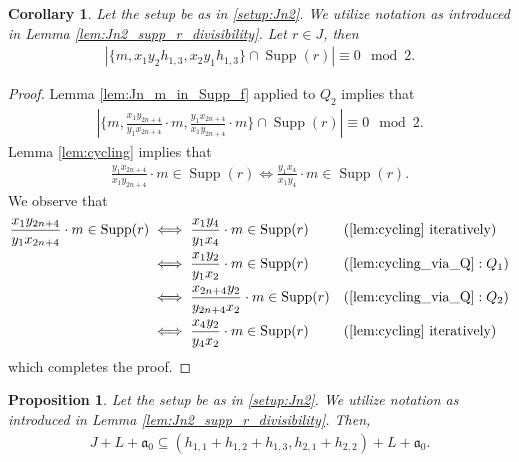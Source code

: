 \documentclass[12pt,a4paper]{amsart}
\theoremstyle{plain}
\newtheorem{prop}[thrm]{Proposition}
\def\bprop{\begin{prop}}
\def\eprop{\end{prop}}
\newtheorem{cor}[thrm]{Corollary}
\def\bcor{\begin{cor}}
\def\ecor{\end{cor}}
\theoremstyle{definition}
\def\bproof{\begin{proof}}
\def\eproof{\end{proof}}
\theoremstyle{remark}
\def\a{\mathfrak{a}}
\DeclareMathOperator{\Supp}{Supp}
\newcommand{\card}[1]{\left \lvert #1 \right\rvert}
\renewcommand{\subset}{\subseteq}
\begin{document}
\bcor 
\label{cor:Jn2_supp_r_exclusivity}
Let the setup be as in \ref{setup:Jn2}. We utilize notation as introduced in Lemma \ref{lem:Jn2_supp_r_divisibility}. Let $r \in J$, then
\begin{align*}
    \card{ \{m, x_{1}y_{2}h_{1,3}, x_{2}y_{1}h_{1,3}\} \cap \Supp(r)  } \equiv 0 \mod{2}.
\end{align*}
\ecor 

\bproof
Lemma \ref{lem:Jn_m_in_Supp_f} applied to $Q_{2}$ implies that
\begin{align*}
    \card{ \{m, \frac{x_{1}y_{2n+4}}{y_{1}x_{2n+4}}\cdot m, \frac{y_{1}x_{2n+4}}{x_{1}y_{2n+4}}\cdot m \} \cap \Supp(r) } \equiv 0 \mod{2}.
\end{align*}
Lemma \ref{lem:cycling} implies that 
\begin{align*}
    \frac{y_{1}x_{2n+4}}{x_{1}y_{2n+4}}\cdot m \in \Supp(r) \iff \frac{y_{1}x_{4}}{x_{1}y_{4}}\cdot m \in \Supp(r).
\end{align*}
We observe that
\begin{align*}
    \frac{x_{1}y_{2n+4}}{y_{1}x_{2n+4}}\cdot m \in \Supp(r)
    &\iff \frac{x_{1}y_{4}}{y_{1}x_{4}}\cdot m \in \Supp(r) & &(\ref{lem:cycling} \text{ iteratively}) \\
    &\iff \frac{x_{1}y_{2}}{y_{1}x_{2}}\cdot m \in \Supp(r) & &(\ref{lem:cycling_via_Q}: Q_{1}) \\
    &\iff \frac{x_{2n+4}y_{2}}{y_{2n+4}x_{2}}\cdot m \in \Supp(r) & &(\ref{lem:cycling_via_Q}: Q_{2}) \\
    &\iff \frac{x_{4}y_{2}}{y_{4}x_{2}}\cdot m \in \Supp(r) & &(\ref{lem:cycling} \text{ iteratively})
\end{align*}
which completes the proof.
\eproof

\bprop 
\label{prop:Jn2_J_contained_in_Q}
Let the setup be as in \ref{setup:Jn2}. We utilize notation as introduced in Lemma \ref{lem:Jn2_supp_r_divisibility}. Then,
\begin{align*}
    J + L + \a_{0} \subset ( h_{1,1} + h_{1,2} + h_{1,3}, h_{2,1} + h_{2,2} ) + L + \a_{0}.
\end{align*}
\eprop 
\end{document}
